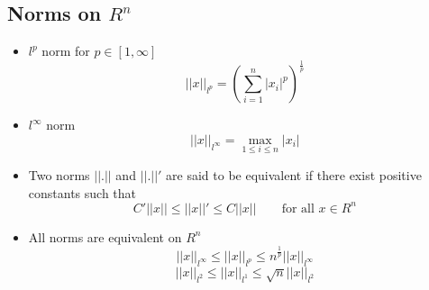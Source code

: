 \documentclass{article}
\begin{document}
\subsection{Norms on $R^n$}
	\begin{itemize}
	\item $l^p$ norm for $p \in [1,\infty]$
		\[||x||_{l^p} = (\sum_{i=1}^n|x_i|^p)^{\frac{1}{p}} \]
	\item $l^\infty$ norm 
		\[||x||_{l^\infty} = \max_{1\leq i\leq n} |x_i|\]
	\item Two norms $||.||$ and $||.||'$ are said to be equivalent if there exist positive constants such that
	\[C' ||x|| \leq ||x||' \leq C ||x|| \qquad \text{for all }x\in R^n\]

	\item All norms are equivalent on $R^n$
	\[||x||_{l^\infty} \leq ||x||_{l^p} \leq n^\frac{1}{p} ||x||_{l^\infty} \]
	\[||x||_{l^2} \leq ||x||_{l^1} \leq \sqrt{n}||x||_{l^2} \]

	\end{itemize}
\end{document}
